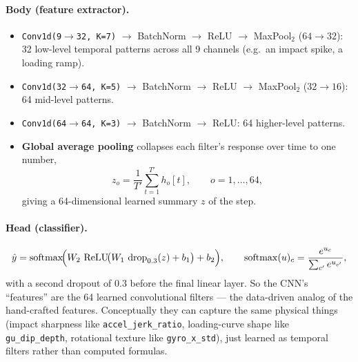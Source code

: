 \documentclass[11pt]{article}
\newcommand{\code}[1]{\texttt{#1}}
\begin{document}
\paragraph{Body (feature extractor).}
\begin{itemize}
  \item \code{Conv1d(9$\to$32, K=7)} $\to$ BatchNorm $\to$ ReLU $\to$ MaxPool$_2$ \; ($64\to32$):
  32 low-level temporal patterns across all 9 channels (e.g.\ an impact spike, a loading ramp).
  \item \code{Conv1d(32$\to$64, K=5)} $\to$ BatchNorm $\to$ ReLU $\to$ MaxPool$_2$ \; ($32\to16$):
  64 mid-level patterns.
  \item \code{Conv1d(64$\to$64, K=3)} $\to$ BatchNorm $\to$ ReLU: 64 higher-level patterns.
  \item \textbf{Global average pooling} collapses each filter's response over time to one number,
  \begin{equation}
  z_o=\frac{1}{T'}\sum_{t=1}^{T'} h_o[t],\qquad o=1,\dots,64,
  \end{equation}
  giving a 64-dimensional learned summary $z$ of the step.
\end{itemize}

\paragraph{Head (classifier).}
\begin{equation}
\hat y=\operatorname{softmax}\!\Bigl(W_2\,\operatorname{ReLU}\!\bigl(W_1\,\operatorname{drop}_{0.3}(z)+b_1\bigr)+b_2\Bigr),
\qquad \operatorname{softmax}(u)_c=\frac{e^{u_c}}{\sum_{c'} e^{u_{c'}}},
\end{equation}
with a second dropout of $0.3$ before the final linear layer. So the CNN's ``features'' are the 64
learned convolutional filters --- the data-driven analog of the hand-crafted features. Conceptually
they can capture the same physical things (impact sharpness like \code{accel_jerk_ratio},
loading-curve shape like \code{gu_dip_depth}, rotational texture like \code{gyro_x_std}), just
learned as temporal filters rather than computed formulas.
\end{document}
